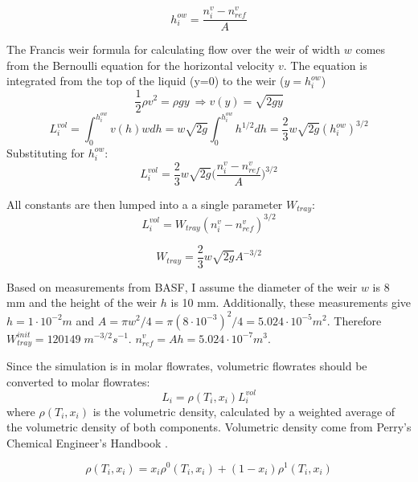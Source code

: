 \begin{equation}
    h^{ow}_i = \frac{n^v_i-n^v_{ref}}{A}
\end{equation}

\noindent The Francis weir formula for calculating flow over the weir of width $w$ comes from the Bernoulli equation for the horizontal velocity $v$. The equation is integrated from the top of the liquid (y=0) to the weir ($y=h_i^{ow}$)
\begin{equation}
    \frac{1}{2} \rho v^2 = \rho g y \ \Longrightarrow v(y) = \sqrt{2gy}
\end{equation}
\begin{equation}
    L_i^{vol} = \int_0^{h_i^{ow}} v(h)wdh = w\sqrt{2g}\int_0^{h_i^{ow}} h^{1/2}dh = \frac{2}{3}w\sqrt{2g}(h_i^{ow})^{3/2} 
\end{equation}
Substituting for $h_i^{ow}$:
\begin{equation}
   L_i^{vol} = \frac{2}{3} w\sqrt{2g}\biggl(\frac{n^v_i-n^v_{ref}}{A}\biggr)^{3/2}  
\end{equation}

\noindent All constants are then lumped into a a single parameter $W_{tray}$:
\begin{equation}
    L_i^{vol} = W_{tray}(n_i^v-n^v_{ref})^{3/2}
\end{equation}

\begin{equation}
    W_{tray} = \frac{2}{3}w\sqrt{2g}A^{-3/2}
\end{equation}

Based on measurements from BASF, I assume the diameter of the weir $w$ is 8 mm and the height of the weir $h$ is 10 mm. Additionally, these measurements give $h = 1\cdot10^{-2} m$ and $A=\pi w^2/4 = \pi(8 \cdot 10^{-3})^2/4 = 5.024 \cdot 10^{-5} m^2$. Therefore $W_{tray}^{init}=120149 \; m^{-3/2}s^{-1}$. $n^v_{ref}=Ah=5.024 \cdot 10^{-7} m^3$. 

Since the simulation is in molar flowrates, volumetric flowrates should be converted to molar flowrates:
\begin{equation}
    L_i = \rho(T_i, x_i)L^{vol}_i  
\end{equation}
where $\rho(T_i,x_i)$ is the volumetric density, calculated by a weighted average of the volumetric density of both components. Volumetric density come from Perry’s Chemical Engineer's Handbook \cite{Perrys2018}.

\begin{equation}
    \rho(T_i, x_i) = x_i\rho^0(T_i, x_i) + (1-x_i)\rho^1(T_i, x_i)
\end{equation}

